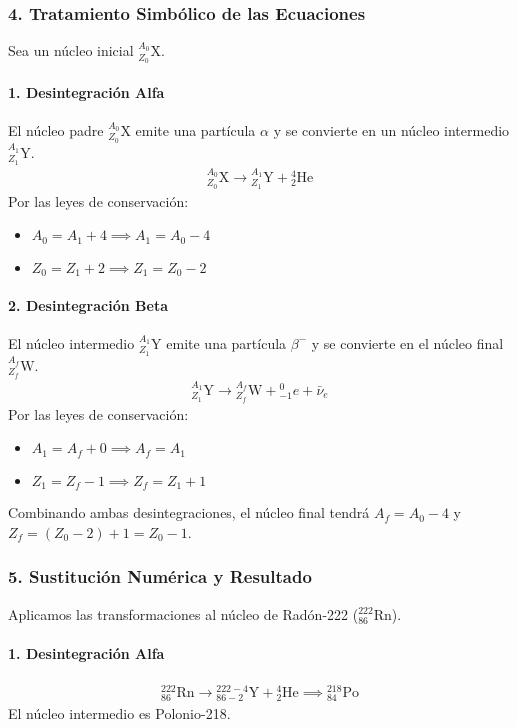 \subsubsection*{4. Tratamiento Simbólico de las Ecuaciones}
Sea un núcleo inicial ${}_{Z_0}^{A_0}\text{X}$.
\paragraph*{1. Desintegración Alfa}
El núcleo padre ${}_{Z_0}^{A_0}\text{X}$ emite una partícula $\alpha$ y se convierte en un núcleo intermedio ${}_{Z_1}^{A_1}\text{Y}$.
\begin{gather}
    {}_{Z_0}^{A_0}\text{X} \longrightarrow {}_{Z_1}^{A_1}\text{Y} + {}_{2}^{4}\text{He}
\end{gather}
Por las leyes de conservación:
\begin{itemize}
    \item $A_0 = A_1 + 4 \implies A_1 = A_0 - 4$
    \item $Z_0 = Z_1 + 2 \implies Z_1 = Z_0 - 2$
\end{itemize}

\paragraph*{2. Desintegración Beta}
El núcleo intermedio ${}_{Z_1}^{A_1}\text{Y}$ emite una partícula $\beta^-$ y se convierte en el núcleo final ${}_{Z_f}^{A_f}\text{W}$.
\begin{gather}
    {}_{Z_1}^{A_1}\text{Y} \longrightarrow {}_{Z_f}^{A_f}\text{W} + {}_{-1}^{0}e + \bar{\nu}_e
\end{gather}
Por las leyes de conservación:
\begin{itemize}
    \item $A_1 = A_f + 0 \implies A_f = A_1$
    \item $Z_1 = Z_f - 1 \implies Z_f = Z_1 + 1$
\end{itemize}
Combinando ambas desintegraciones, el núcleo final tendrá $A_f = A_0 - 4$ y $Z_f = (Z_0 - 2) + 1 = Z_0 - 1$.

\subsubsection*{5. Sustitución Numérica y Resultado}
Aplicamos las transformaciones al núcleo de Radón-222 (${}_{86}^{222}\text{Rn}$).
\paragraph*{1. Desintegración Alfa}
\begin{gather}
    {}_{86}^{222}\text{Rn} \longrightarrow {}_{86-2}^{222-4}\text{Y} + {}_{2}^{4}\text{He} \implies {}_{84}^{218}\text{Po}
\end{gather}
El núcleo intermedio es Polonio-218.

